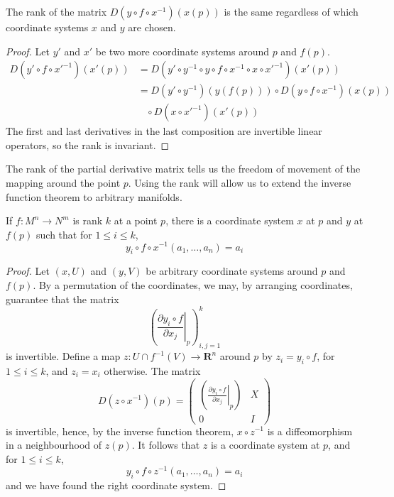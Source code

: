 \begin{theorem}
    The rank of the matrix $D(y \circ f \circ x^{-1})(x(p))$ is the same regardless of which coordinate systems $x$ and $y$ are chosen.
\end{theorem}
\begin{proof}
    Let $y'$ and $x'$ be two more coordinate systems around $p$ and $f(p)$.
    \begin{align*}
        D(y' \circ f \circ x'^{-1})(x'(p)) &= D(y' \circ y^{-1} \circ y \circ f \circ x^{-1} \circ x \circ x'^{-1})(x'(p))\\
        &= D(y' \circ y^{-1})(y(f(p))) \circ D(y \circ f \circ x^{-1})(x(p)) 
        \\ &\ \ \ \ \circ D(x \circ x'^{-1})(x'(p))
    \end{align*}
    The first and last derivatives in the last composition are invertible linear operators, so the rank is invariant.
\end{proof}

The rank of the partial derivative matrix tells us the freedom of movement of the mapping around the point $p$. Using the rank will allow us to extend the inverse function theorem to arbitrary manifolds.

\begin{theorem}
    If $f:M^n \to N^m$ is rank $k$ at a point $p$, there is a coordinate system $x$ at $p$ and $y$ at $f(p)$ such that for $1 \leq i \leq k$,
    \[ y_i \circ f \circ x^{-1}(a_1, \dots, a_n) = a_i \]
\end{theorem}
\begin{proof}
    Let $(x,U)$ and $(y,V)$ be arbitrary coordinate systems around $p$ and $f(p)$. By a permutation of the coordinates, we may, by arranging coordinates, guarantee that the matrix
    \[ \left( \left.\frac{\partial y_i \circ f}{\partial x_j}\right|_p \right)_{i,j = 1}^k \]
    is invertible. Define a map $z:U \cap f^{-1}(V) \to \mathbf{R}^n$ around $p$ by $z_i = y_i \circ f$, for $1 \leq i \leq k$, and $z_i = x_i$ otherwise. The matrix
    \[ D(z \circ x^{-1})(p) = \begin{pmatrix} \left( \left.\frac{\partial y_i \circ f}{\partial x_j}\right|_p \right) & X \\ 0 & I \end{pmatrix} \]
    is invertible, hence, by the inverse function theorem, $x \circ z^{-1}$ is a diffeomorphism in a neighbourhood of $z(p)$. It follows that $z$ is a coordinate system at $p$, and for $1 \leq i \leq k$,
    \[ y_i \circ f \circ z^{-1}(a_1, \dots, a_n) = a_i \]
    and we have found the right coordinate system.
\end{proof}

